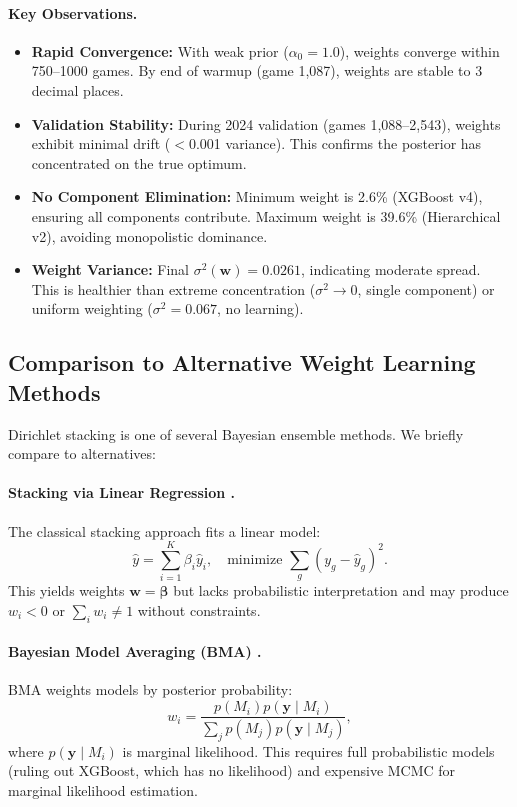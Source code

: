 \paragraph{Key Observations.}
\begin{itemize}
\item \textbf{Rapid Convergence:} With weak prior ($\alpha_0=1.0$), weights converge within 750--1000 games. By end of warmup (game 1,087), weights are stable to 3 decimal places.

\item \textbf{Validation Stability:} During 2024 validation (games 1,088--2,543), weights exhibit minimal drift ($<$0.001 variance). This confirms the posterior has concentrated on the true optimum.

\item \textbf{No Component Elimination:} Minimum weight is 2.6\% (XGBoost v4), ensuring all components contribute. Maximum weight is 39.6\% (Hierarchical v2), avoiding monopolistic dominance.

\item \textbf{Weight Variance:} Final $\sigma^2(\mathbf{w}) = 0.0261$, indicating moderate spread. This is healthier than extreme concentration ($\sigma^2 \to 0$, single component) or uniform weighting ($\sigma^2 = 0.067$, no learning).
\end{itemize}

\subsection{Comparison to Alternative Weight Learning Methods}
\label{subsec:alternative-weight-learning}

Dirichlet stacking is one of several Bayesian ensemble methods. We briefly compare to alternatives:

\paragraph{Stacking via Linear Regression \citep{wolpert1992}.}
The classical stacking approach fits a linear model:
\begin{equation}
\hat{y} = \sum_{i=1}^K \beta_i \hat{y}_i, \quad \text{minimize } \sum_g (y_g - \hat{y}_g)^2.
\end{equation}
This yields weights $\mathbf{w} = \boldsymbol{\beta}$ but lacks probabilistic interpretation and may produce $w_i < 0$ or $\sum_i w_i \neq 1$ without constraints.

\paragraph{Bayesian Model Averaging (BMA) \citep{hoeting1999bayesian}.}
BMA weights models by posterior probability:
\begin{equation}
w_i = \frac{p(M_i) p(\mathbf{y} \mid M_i)}{\sum_j p(M_j) p(\mathbf{y} \mid M_j)},
\end{equation}
where $p(\mathbf{y} \mid M_i)$ is marginal likelihood. This requires full probabilistic models (ruling out XGBoost, which has no likelihood) and expensive MCMC for marginal likelihood estimation.

